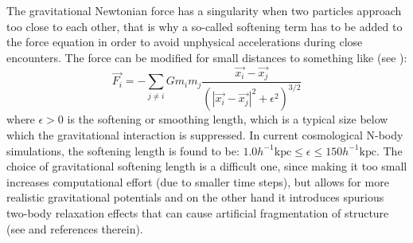 The gravitational Newtonian force has a singularity when two particles
approach too close to each other, that is why a so-called softening
term has to be added to the force equation in order to avoid unphysical
accelerations during close encounters. The force can be modified for
small distances to something like (see \citet{trenti_gravitational_2008}):
\begin{equation}
\vec{F_{i}}=-\sum_{j\neq i}Gm_{i}m_{j}\frac{\vec{x_{i}}-\vec{x_{j}}}{\left(\left|\vec{x_{i}}-\vec{x_{j}}\right|^{2}+\epsilon^{2}\right)^{3/2}}
\end{equation}
where $\epsilon>0$ is the softening or smoothing length, which is
a typical size below which the gravitational interaction is suppressed.
In current cosmological N-body simulations, the softening length is
found to be: $1.0h^{-1}\mbox{kpc}\leq\epsilon\leq150h^{-1}\mbox{kpc}$.
The choice of gravitational softening length is a difficult one,
since making it too small increases computational effort
(due to smaller time steps), but allows for more realistic gravitational
potentials and on the other hand it introduces spurious two-body relaxation
effects that can cause artificial fragmentation of structure (see
\citet{kuhlen_numerical_2012} and references therein).

